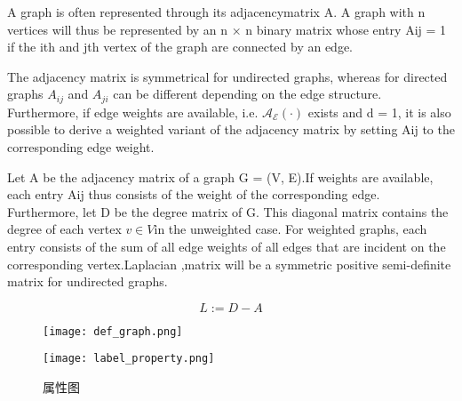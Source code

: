      \begin{mydef}
        A graph is often represented through its adjacencymatrix A. A graph with n vertices will thus be represented by an n × n binary matrix whose entry Aij = 1 if the ith and jth vertex of the graph are connected by an edge. 
        \begin{myRemark}
            The adjacency matrix is symmetrical for undirected graphs, whereas for directed graphs $A_{ij}$ and $A_{ji}$ can be different depending on the edge structure. Furthermore, if edge weights are available,
            i.e. $\mathcal{A_{E} (\cdot)} $ exists and d = 1, it is also possible to derive a weighted variant of the adjacency
            matrix by setting Aij to the corresponding edge weight.
        \end{myRemark}
     \end{mydef}
     
     \begin{mydef}
        Let A be the adjacency matrix of a graph G = (V, E).If weights are available, each entry Aij thus consists of the weight of the corresponding edge. Furthermore, let D be the degree matrix of G. This diagonal matrix contains the degree of each vertex $v \in  V $in the unweighted case.  For weighted graphs, each entry consists of the sum of all edge weights of all edges that are incident on the corresponding vertex.Laplacian ,matrix will be a symmetric positive semi-definite matrix for undirected graphs. 
        
        \begin{equation}
            L := D − A
        \end{equation}
     \end{mydef}
\begin{figure}[ht!]
    \centering
    \texttt{[image: def\_graph.png]}
\end{figure}
\begin{figure}[htb!]
    \centering
    \texttt{[image: label\_property.png]}
    \caption{属性图}
\end{figure}